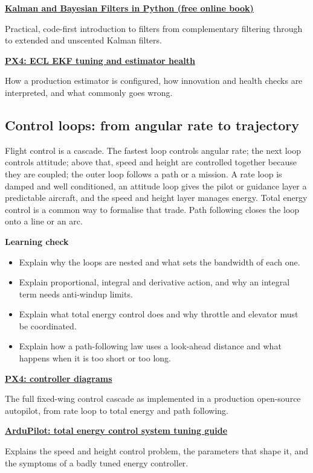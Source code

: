 \documentclass[11pt,a4paper]{article}
\newcommand{\Resource}[3]{%
  \begin{resourcebox}
    \href{#2}{\textbf{\color{DARESTeal}#1}}\par
    {\small #3}
  \end{resourcebox}
}
\begin{document}
\Resource
  {Kalman and Bayesian Filters in Python (free online book)}
  {https://github.com/rlabbe/Kalman-and-Bayesian-Filters-in-Python}
  {Practical, code-first introduction to filters from complementary filtering through to extended and unscented Kalman filters.}

\Resource
  {PX4: ECL EKF tuning and estimator health}
  {https://docs.px4.io/main/en/advanced_config/tuning_the_ecl_ekf.html}
  {How a production estimator is configured, how innovation and health checks are interpreted, and what commonly goes wrong.}

\subsection{Control loops: from angular rate to trajectory}

Flight control is a cascade. The fastest loop controls angular rate; the next
loop controls attitude; above that, speed and height are controlled together
because they are coupled; the outer loop follows a path or a mission. A rate
loop is damped and well conditioned, an attitude loop gives the pilot or
guidance layer a predictable aircraft, and the speed and height layer manages
energy. Total energy control is a common way to formalise that trade. Path
following closes the loop onto a line or an arc.

\textbf{Learning check}
\begin{itemize}
  \item Explain why the loops are nested and what sets the bandwidth of each one.
  \item Explain proportional, integral and derivative action, and why an integral term needs anti-windup limits.
  \item Explain what total energy control does and why throttle and elevator must be coordinated.
  \item Explain how a path-following law uses a look-ahead distance and what happens when it is too short or too long.
\end{itemize}

\Resource
  {PX4: controller diagrams}
  {https://docs.px4.io/main/en/flight_stack/controller_diagrams.html}
  {The full fixed-wing control cascade as implemented in a production open-source autopilot, from rate loop to total energy and path following.}

\Resource
  {ArduPilot: total energy control system tuning guide}
  {https://ardupilot.org/plane/docs/tecs-total-energy-control-system-for-speed-height-tuning-guide.html}
  {Explains the speed and height control problem, the parameters that shape it, and the symptoms of a badly tuned energy controller.}
\end{document}
